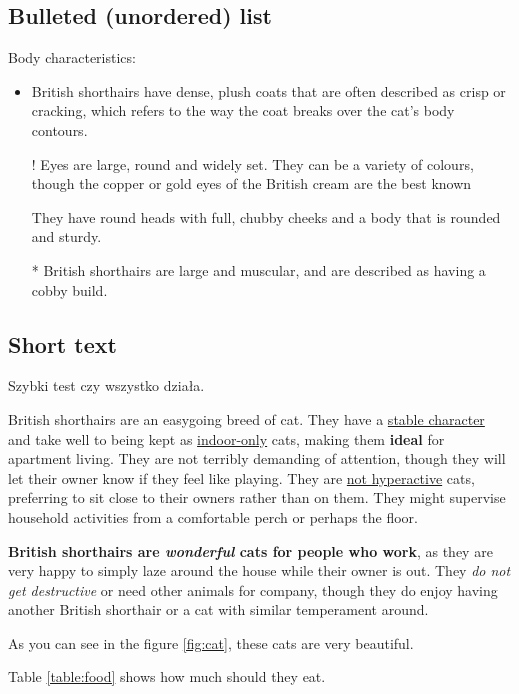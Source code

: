 \subsection{Bulleted (unordered) list}
    Body characteristics:
    \begin{itemize}
         \item British shorthairs have dense, plush coats that are often described as crisp or cracking, which refers to the way the coat breaks over the cat's body contours.
         \item[!] Eyes are large, round and widely set. They can be a variety of colours, though the copper or gold eyes of the British cream are the best known
        \item[ ] They have round heads with full, chubby cheeks and a body that is rounded and sturdy.
        \item [*] British shorthairs are large and muscular, and are described as having a cobby build.
    \end{itemize}
    
\subsection{Short text}
    Szybki test czy wszystko działa. \par
    British shorthairs are an easygoing breed of cat. They have a \underline{stable character} and take well to being kept as \underline{indoor-only} cats, making them \textbf{ideal} for apartment living. They are not terribly demanding of attention, though they will let their owner know if they feel like playing. They are \underline{not hyperactive} cats, preferring to sit close to their owners rather than on them. They might supervise household activities from a comfortable perch or perhaps the floor. \par
    \textbf{British shorthairs are \emph{wonderful} cats for people who work}, as they are very happy to simply laze around the house while their owner is out. They \emph{do not get destructive} or need other animals for company, though they do enjoy having another British shorthair or a cat with similar temperament around. \par
    As you can see in the figure \ref{fig:cat}, these cats are very beautiful. \par
    Table \ref{table:food} shows how much should they eat.

